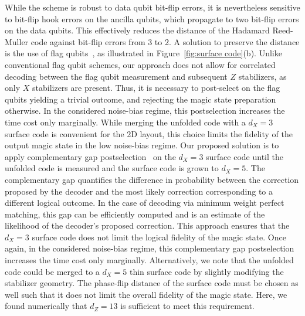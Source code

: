 \documentclass[%
 reprint,
superscriptaddress,
 amsmath,amssymb,
 aps,
]{revtex4-2}
\begin{document}
While the scheme is robust to data qubit bit-flip errors, it is nevertheless sensitive to bit-flip hook errors on the ancilla qubits, which propagate to two bit-flip errors on the data qubits. This effectively reduces the distance of the Hadamard Reed-Muller code against bit-flip errors from 3 to 2. A solution to preserve the distance is the use of flag qubits~\cite{chao2018quantum}, as illustrated in Figure~\ref{fig:surface code}(b). Unlike conventional flag qubit schemes, our approach does not allow for correlated decoding between the flag qubit measurement and subsequent $Z$ stabilizers, as only $X$ stabilizers are present. Thus, it is necessary to post-select on the flag qubits yielding a trivial outcome, and rejecting the magic state preparation otherwise. In the considered noise-bias regime, this postselection increases the time cost only marginally. While merging the unfolded code with a $d_X= 3$ surface code is convenient for the 2D layout, this choice limits the fidelity of the output magic state in the low noise-bias regime. Our proposed solution is to apply complementary gap postselection~\cite{gidney2024yoked} on the $d_X=3$ surface code until the unfolded code is measured and the surface code is grown to $d_X=5$. The complementary gap quantifies the difference in probability between the correction proposed by the decoder and the most likely correction corresponding to a different logical outcome. In the case of decoding via minimum weight perfect matching, this gap can be efficiently computed and is an estimate of the likelihood of the decoder’s proposed correction. This approach ensures that the $d_X = 3$ surface code does not limit the logical fidelity of the magic state. Once again, in the considered noise-bias regime, this complementary gap postselection increases the time cost only marginally. Alternatively, we note that the unfolded code could be merged to a $d_X=5$ thin surface code by slightly modifying the stabilizer geometry. The phase-flip distance of the surface code must be chosen as well such that it does not limit the overall fidelity of the magic state. Here, we found numerically that $d_Z = 13$ is sufficient to meet this requirement.
\end{document}

